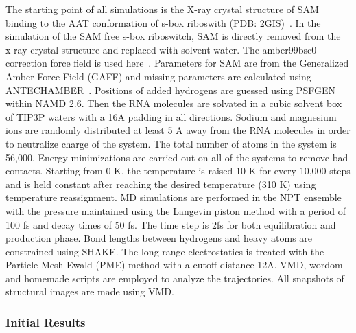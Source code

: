 \documentclass[a4paper,10pt]{article}
\begin{document}
The starting point of all simulations is the X-ray crystal structure of SAM binding to the AAT conformation 
of s-box riboswith (PDB: 2GIS)~\cite{montange}. In the simulation of the SAM free s-box riboswitch, SAM 
is directly removed from the x-ray crystal structure and replaced with solvent water. The amber99bsc0
correction force field is used here~\cite{alberto}. Parameters for SAM are from the Generalized Amber 
Force Field (GAFF) and missing parameters are calculated using ANTECHAMBER~\cite{wang}. Positions 
of added hydrogens are guessed using PSFGEN within NAMD 2.6. Then the RNA molecules are solvated 
in a cubic solvent box of TIP3P waters with a 16A padding in all directions. Sodium and magnesium ions 
are randomly distributed at least 5 A away from the RNA molecules in order to neutralize charge of the 
system. The total number of atoms in the system is 56,000. Energy minimizations are carried out on all of the systems to remove bad contacts. Starting from 
0 K, the temperature is raised 10 K for every 10,000 steps and is held constant after reaching the desired 
temperature (310 K) using temperature reassignment. MD simulations are performed in the NPT ensemble 
with the pressure maintained using the Langevin piston method with a period of 100 fs and decay times of 
50 fs. The time step is 2fs for both equilibration and production phase. Bond lengths between hydrogens 
and heavy atoms are constrained using SHAKE. The long-range electrostatics is treated with the Particle 
Mesh Ewald (PME) method with a cutoff distance 12A.  VMD, wordom~\cite{moe} and homemade scripts are employed to analyze the trajectories. All snapshots 
of structural images are made using VMD.



\subsubsection*{Initial Results}
\end{document}
